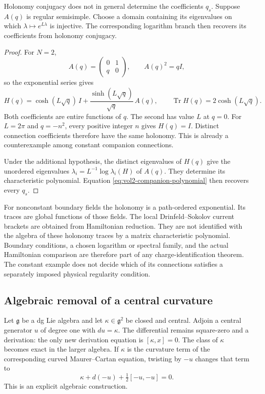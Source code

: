 \begin{proposition}\label{prop:vol2-holonomy-logarithm}
Holonomy conjugacy does not in general determine the coefficients
$q_s$.
Suppose $A(q)$ is regular semisimple.
Choose a domain containing its eigenvalues on which
$\lambda\mapsto e^{L\lambda}$ is injective.
The corresponding logarithm branch then recovers its coefficients
from holonomy conjugacy.
\end{proposition}
\begin{proof}
For $N=2$,
\[
 A(q)=\begin{pmatrix}0&1\\q&0\end{pmatrix},\qquad A(q)^2=qI,
\]
so the exponential series gives
\begin{equation}\label{eq:vol2-sl2-holonomy}
 H(q)=\cosh(L\sqrt q)\,I
       +\frac{\sinh(L\sqrt q)}{\sqrt q}\,A(q),
 \qquad
 \operatorname{Tr}H(q)=2\cosh(L\sqrt q).
\end{equation}
Both coefficients are entire functions of $q$. The second has
value $L$ at $q=0$.
For $L=2\pi$ and $q=-n^2$, every positive integer $n$ gives
$H(q)=I$.
Distinct connection coefficients therefore have the same holonomy.
This is already a counterexample among constant companion
connections.

Under the additional hypothesis, the distinct eigenvalues of
$H(q)$ give the unordered eigenvalues
$\lambda_i=L^{-1}\log\lambda_i(H)$ of $A(q)$.
They determine its characteristic polynomial.
Equation \eqref{eq:vol2-companion-polynomial} then recovers every
$q_s$.
\end{proof}

For nonconstant boundary fields the holonomy is a path-ordered
exponential. Its traces are global functions of those fields.
The local Drinfeld--Sokolov current brackets are obtained from
Hamiltonian reduction. They are not identified with the algebra
of these holonomy traces by a matrix characteristic polynomial.
Boundary conditions, a chosen logarithm or spectral family, and
the actual Hamiltonian comparison are therefore part of any
charge-identification theorem.
The constant example does not decide which of its connections
satisfies a separately imposed physical regularity condition.

\subsection{Algebraic removal of a central curvature}

Let $\mathfrak g$ be a dg Lie algebra and let
$\kappa\in\mathfrak g^2$ be closed and central.
Adjoin a central generator $u$ of degree one with $du=\kappa$.
The differential remains square-zero and a derivation:
the only new derivation equation is $[\kappa,x]=0$.
The class of $\kappa$ becomes exact in the larger algebra.
If $\kappa$ is the curvature term of the corresponding curved
Maurer--Cartan equation, twisting by $-u$ changes that term to
\[
 \kappa+d(-u)+\tfrac12[-u,-u]=0.
\]
This is an explicit algebraic construction.

